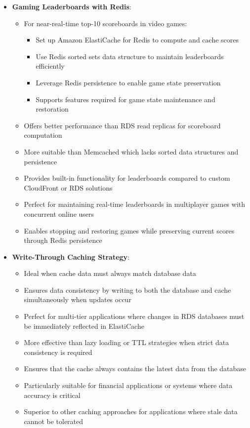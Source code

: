 \documentclass[11pt,a4paper]{report}
\begin{document}
\begin{itemize}
\begin{itemize}
\end{itemize}
  \item \textbf{Gaming Leaderboards with Redis}:
\begin{itemize}
  \item For near-real-time top-10 scoreboards in video games:
\begin{itemize}
  \item Set up Amazon ElastiCache for Redis to compute and cache scores
  \item Use Redis sorted sets data structure to maintain leaderboards efficiently
  \item Leverage Redis persistence to enable game state preservation
  \item Supports features required for game state maintenance and restoration
\end{itemize}
  \item Offers better performance than RDS read replicas for scoreboard computation
  \item More suitable than Memcached which lacks sorted data structures and persistence
  \item Provides built-in functionality for leaderboards compared to custom CloudFront or RDS solutions
  \item Perfect for maintaining real-time leaderboards in multiplayer games with concurrent online users
  \item Enables stopping and restoring games while preserving current scores through Redis persistence
\end{itemize}
  \item \textbf{Write-Through Caching Strategy}:
\begin{itemize}
  \item Ideal when cache data must always match database data
  \item Ensures data consistency by writing to both the database and cache simultaneously when updates occur
  \item Perfect for multi-tier applications where changes in RDS databases must be immediately reflected in ElastiCache
  \item More effective than lazy loading or TTL strategies when strict data consistency is required
  \item Ensures that the cache always contains the latest data from the database
  \item Particularly suitable for financial applications or systems where data accuracy is critical
  \item Superior to other caching approaches for applications where stale data cannot be tolerated

\end{itemize}
\end{itemize}
\end{document}

